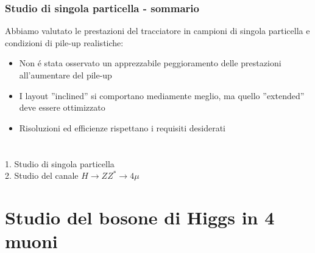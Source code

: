 \documentclass{beamer}
\begin{document}
\begin{frame}
\frametitle{Studio di singola particella - sommario}
Abbiamo valutato le prestazioni del tracciatore in campioni di singola
particella e condizioni di pile-up realistiche:
\begin{itemize}
\item Non \'e stata osservato un apprezzabile peggioramento delle prestazioni
all'aumentare del pile-up
\item I layout ''inclined'' si comportano mediamente meglio, ma quello 
''extended'' deve essere ottimizzato
\item Risoluzioni ed efficienze rispettano i requisiti desiderati
\end{itemize}

\end{frame}

\section{}
\begin{frame}


\Large{\color{gray}1. Studio di singola particella}\\
\bigskip
\bigskip
\bigskip
\Large{\color{dred}2. Studio del canale $H \rightarrow ZZ^{*} \rightarrow 4\mu$}

\end{frame}


\section{Studio del bosone di Higgs in 4 muoni}
\end{document}
